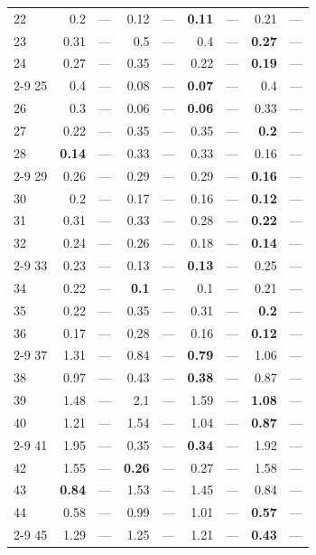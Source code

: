 \begin{longtable}{lr@{\hskip 4pt}l@{\hskip 12pt}r@{\hskip 4pt}l@{\hskip 12pt}r@{\hskip 4pt}l@{\hskip 12pt}r@{\hskip 4pt}l@{\hskip 12pt}}
22 & 0.2 & --- & 0.12 & --- & \textbf{0.11} & --- & 0.21 & --- \\
23 & 0.31 & --- & 0.5 & --- & 0.4 & --- & \textbf{0.27} & --- \\
24 & 0.27 & --- & 0.35 & --- & 0.22 & --- & \textbf{0.19} & --- \\
\cmidrule{2-9}
25 & 0.4 & --- & 0.08 & --- & \textbf{0.07} & --- & 0.4 & --- \\
26 & 0.3 & --- & 0.06 & --- & \textbf{0.06} & --- & 0.33 & --- \\
27 & 0.22 & --- & 0.35 & --- & 0.35 & --- & \textbf{0.2} & --- \\
28 & \textbf{0.14} & --- & 0.33 & --- & 0.33 & --- & 0.16 & --- \\
\cmidrule{2-9}
29 & 0.26 & --- & 0.29 & --- & 0.29 & --- & \textbf{0.16} & --- \\
30 & 0.2 & --- & 0.17 & --- & 0.16 & --- & \textbf{0.12} & --- \\
31 & 0.31 & --- & 0.33 & --- & 0.28 & --- & \textbf{0.22} & --- \\
32 & 0.24 & --- & 0.26 & --- & 0.18 & --- & \textbf{0.14} & --- \\
\cmidrule{2-9}
33 & 0.23 & --- & 0.13 & --- & \textbf{0.13} & --- & 0.25 & --- \\
34 & 0.22 & --- & \textbf{0.1} & --- & 0.1 & --- & 0.21 & --- \\
35 & 0.22 & --- & 0.35 & --- & 0.31 & --- & \textbf{0.2} & --- \\
36 & 0.17 & --- & 0.28 & --- & 0.16 & --- & \textbf{0.12} & --- \\
\cmidrule{2-9}
37 & 1.31 & --- & 0.84 & --- & \textbf{0.79} & --- & 1.06 & --- \\
38 & 0.97 & --- & 0.43 & --- & \textbf{0.38} & --- & 0.87 & --- \\
39 & 1.48 & --- & 2.1 & --- & 1.59 & --- & \textbf{1.08} & --- \\
40 & 1.21 & --- & 1.54 & --- & 1.04 & --- & \textbf{0.87} & --- \\
\cmidrule{2-9}
41 & 1.95 & --- & 0.35 & --- & \textbf{0.34} & --- & 1.92 & --- \\
42 & 1.55 & --- & \textbf{0.26} & --- & 0.27 & --- & 1.58 & --- \\
43 & \textbf{0.84} & --- & 1.53 & --- & 1.45 & --- & 0.84 & --- \\
44 & 0.58 & --- & 0.99 & --- & 1.01 & --- & \textbf{0.57} & --- \\
\cmidrule{2-9}
45 & 1.29 & --- & 1.25 & --- & 1.21 & --- & \textbf{0.43} & --- \\

\end{longtable}
